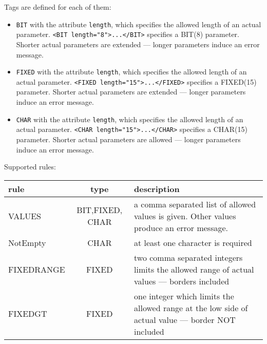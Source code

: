 Tags are defined for each of them:
\begin{itemize}
\item \verb|BIT| with the attribute \verb|length|, which specifies the 
   allowed length of an actual parameter. \verb|<BIT length="8">...</BIT>|
   specifies a BIT(8) parameter. Shorter actual parameters are extended --- 
   longer parameters induce an error message.
\item \verb|FIXED| with the attribute \verb|length|, which specifies the 
   allowed length of an actual parameter. \verb|<FIXED length="15">...</FIXED>|
   specifies a FIXED(15) parameter. Shorter actual parameters are extended --- 
   longer parameters induce an error message.
\item \verb|CHAR| with the attribute \verb|length|, which specifies the 
   allowed length of an actual parameter. \verb|<CHAR length="15">...</CHAR>|
   specifies a CHAR(15) parameter. Shorter actual parameters are allowed --- 
   longer parameters induce an error message.
\end{itemize}

Supported rules:

\begin{tabular}{|l|c|p{8cm}|}
\hline
rule & type & description \\
\hline
VALUES & BIT,FIXED, CHAR &
   a comma separated list of allowed values
   is given. Other values produce an error message. \\
\hline
NotEmpty & CHAR & 
   at least one character is required \\   
\hline
FIXEDRANGE & FIXED &
   two comma separated integers limits the allowed range
   of actual values --- borders included \\ 
\hline
FIXEDGT & FIXED &
   one integer which limits the allowed range at the low side
   of actual value --- border NOT included \\ 
\hline
\end{tabular}

